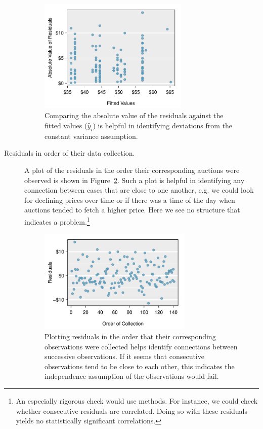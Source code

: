 \begin{description}
\begin{figure}
\centering
\includegraphics[width=0.7\textwidth]{ch_regr_mult_and_log/figures/marioKartDiagnostics/mkDiagnosticEvsAbsF}
\caption{Comparing the absolute value of the residuals against the fitted values ($\hat{y}_i$) is helpful in identifying deviations from the constant variance assumption.}
\label{mkDiagnosticEvsAbsF}
\end{figure}

\item[Residuals in order of their data collection.] A plot of the residuals in the order their corresponding auctions were observed is shown in Figure~\ref{mkDiagnosticInOrder}. Such a plot is helpful in identifying any connection between cases that are close to one another, e.g. we could look for declining prices over time or if there was a time of the day when auctions tended to fetch a higher price. Here we see no structure that indicates a problem.\footnote{An especially rigorous check would use  methods. For instance, we could check whether consecutive residuals are correlated. Doing so with these residuals yields no statistically significant correlations.}

\begin{figure}[h]
\centering
\includegraphics[width=0.72\textwidth]{ch_regr_mult_and_log/figures/marioKartDiagnostics/mkDiagnosticInOrder}
\caption{Plotting residuals in the order that their corresponding observations were collected helps identify connections between successive observations. If it seems that consecutive observations tend to be close to each other, this indicates the independence assumption of the observations would fail.}
\label{mkDiagnosticInOrder}
\end{figure}


\end{description}
